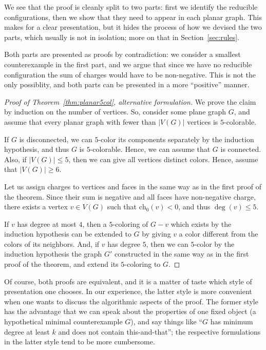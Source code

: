\documentclass[12pt,twoside,openright,a4paper]{book}
\newcommand{\initch}{\text{ch}_0}
\begin{document}
We see that the proof is cleanly split to two parts: first we identify the reducible configurations, then we show
that they need to appear in each planar graph.  This makes for a clear presentation, but it hides the process of
how we devised the two parts, which usually is not in isolation; more on that in Section~\ref{sec:rules}.

Both parts are presented as proofs by contradiction: we consider a smallest counterexample in the first part,
and we argue that since we have no reducible configuration the sum of charges would have to be non-negative.
This is not the only possiblity, and both parts can be presented in a more ``positive'' manner.

\begin{proof}[Proof of Theorem~\ref{thm:planar5col}, alternative formulation]
We prove the claim by induction on the number of vertices.  So, consider some plane graph $G$, and assume
that every planar graph with fewer than $|V(G)|$ vertices is $5$-colorable.

If $G$ is disconnected, we can $5$-color its components separately by the induction hypothesis, and thus $G$
is $5$-colorable.  Hence, we can assume that $G$ is connected.  Also, if $|V(G)|\le 5$, then we can give all
vertices distinct colors.  Hence, assume that $|V(G)|\ge 6$.

Let us assign charges to vertices and faces in the same way as in the first proof of the theorem.
Since their sum is negative and all faces have non-negative charge, there exists a vertex $v\in V(G)$
such that $\initch(v)<0$, and thus $\deg(v)\le 5$.

If $v$ has degree at most $4$, then a $5$-coloring of $G-v$ which exists by the induction hypothesis can be extended to $G$ by giving $v$ a color
different from the colors of its neighbors.  And, if $v$ has degree $5$, then we can $5$-color by
the induction hypothesis the graph $G'$ constructed in the same way as in the first proof of the theorem, and extend its
$5$-coloring to $G$.
\end{proof}

Of course, both proofs are equivalent, and it is a matter of taste which style of presentation one chooses.
In our experience, the latter style is more convenient when one wants to discuss the algorithmic aspects of the proof.
The former style has the advantage that we can speak about the properties of one fixed object (a hypothetical minimal
counterexample $G$), and say things like ``$G$ has minimum degree at least $k$ and does not contain this-and-that'';
the respective formulations in the latter style tend to be more cumbersome.
\end{document}
